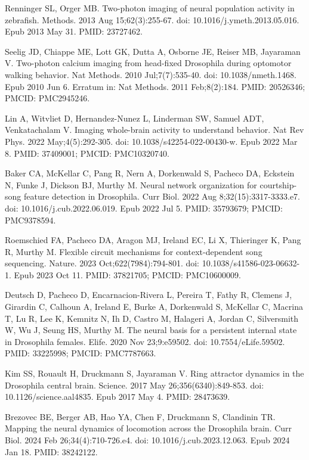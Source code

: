 \documentclass[10pt,letterpaper]{article}
\begin{document}
\begin{thebibliography}{10}
Renninger SL, Orger MB. Two-photon imaging of neural population activity in zebrafish. Methods. 2013 Aug 15;62(3):255-67. doi: 10.1016/j.ymeth.2013.05.016. Epub 2013 May 31. PMID: 23727462.

Seelig JD, Chiappe ME, Lott GK, Dutta A, Osborne JE, Reiser MB, Jayaraman V. Two-photon calcium imaging from head-fixed Drosophila during optomotor walking behavior. Nat Methods. 2010 Jul;7(7):535-40. doi: 10.1038/nmeth.1468. Epub 2010 Jun 6. Erratum in: Nat Methods. 2011 Feb;8(2):184. PMID: 20526346; PMCID: PMC2945246.

Lin A, Witvliet D, Hernandez-Nunez L, Linderman SW, Samuel ADT, Venkatachalam V. Imaging whole-brain activity to understand behavior. Nat Rev Phys. 2022 May;4(5):292-305. doi: 10.1038/s42254-022-00430-w. Epub 2022 Mar 8. PMID: 37409001; PMCID: PMC10320740.

Baker CA, McKellar C, Pang R, Nern A, Dorkenwald S, Pacheco DA, Eckstein N, Funke J, Dickson BJ, Murthy M. Neural network organization for courtship-song feature detection in Drosophila. Curr Biol. 2022 Aug 8;32(15):3317-3333.e7. doi: 10.1016/j.cub.2022.06.019. Epub 2022 Jul 5. PMID: 35793679; PMCID: PMC9378594. 

Roemschied FA, Pacheco DA, Aragon MJ, Ireland EC, Li X, Thieringer K, Pang R, Murthy M. Flexible circuit mechanisms for context-dependent song sequencing. Nature. 2023 Oct;622(7984):794-801. doi: 10.1038/s41586-023-06632-1. Epub 2023 Oct 11. PMID: 37821705; PMCID: PMC10600009.

Deutsch D, Pacheco D, Encarnacion-Rivera L, Pereira T, Fathy R, Clemens J, Girardin C, Calhoun A, Ireland E, Burke A, Dorkenwald S, McKellar C, Macrina T, Lu R, Lee K, Kemnitz N, Ih D, Castro M, Halageri A, Jordan C, Silversmith W, Wu J, Seung HS, Murthy M. The neural basis for a persistent internal state in Drosophila females. Elife. 2020 Nov 23;9:e59502. doi: 10.7554/eLife.59502. PMID: 33225998; PMCID: PMC7787663.

Kim SS, Rouault H, Druckmann S, Jayaraman V. Ring attractor dynamics in the Drosophila central brain. Science. 2017 May 26;356(6340):849-853. doi: 10.1126/science.aal4835. Epub 2017 May 4. PMID: 28473639.

Brezovec BE, Berger AB, Hao YA, Chen F, Druckmann S, Clandinin TR. Mapping the neural dynamics of locomotion across the Drosophila brain. Curr Biol. 2024 Feb 26;34(4):710-726.e4. doi: 10.1016/j.cub.2023.12.063. Epub 2024 Jan 18. PMID: 38242122.


\end{thebibliography}
\end{document}
